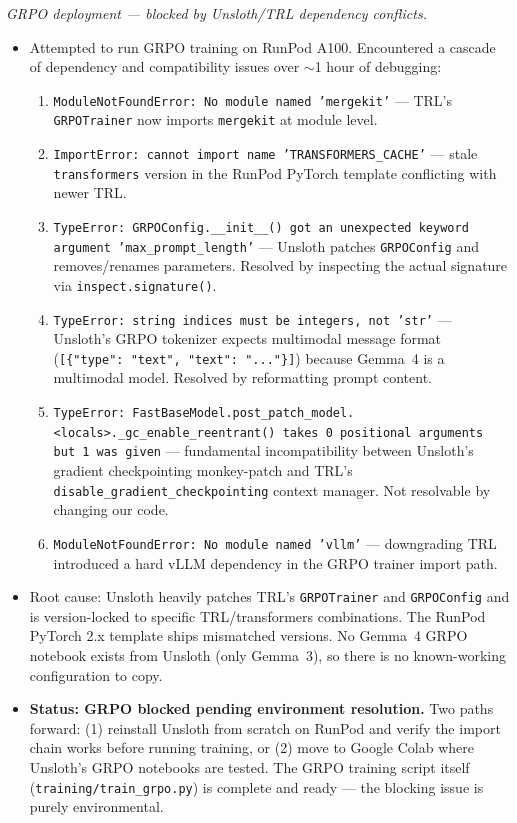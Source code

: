 \documentclass{article}
\theoremstyle{plain}
\theoremstyle{definition}
\theoremstyle{remark}
\begin{document}
\textit{GRPO deployment --- blocked by Unsloth/TRL dependency conflicts.}
\begin{itemize}
\item Attempted to run GRPO training on RunPod A100. Encountered a cascade of dependency and compatibility issues over $\sim$1 hour of debugging:
  \begin{enumerate}
  \item \texttt{ModuleNotFoundError: No module named 'mergekit'} --- TRL's \texttt{GRPOTrainer} now imports \texttt{mergekit} at module level.
  \item \texttt{ImportError: cannot import name 'TRANSFORMERS\_CACHE'} --- stale \texttt{transformers} version in the RunPod PyTorch template conflicting with newer TRL.
  \item \texttt{TypeError: GRPOConfig.\_\_init\_\_() got an unexpected keyword argument 'max\_prompt\_length'} --- Unsloth patches \texttt{GRPOConfig} and removes/renames parameters. Resolved by inspecting the actual signature via \texttt{inspect.signature()}.
  \item \texttt{TypeError: string indices must be integers, not 'str'} --- Unsloth's GRPO tokenizer expects multimodal message format (\texttt{[\{"type": "text", "text": "..."\}]}) because Gemma~4 is a multimodal model. Resolved by reformatting prompt content.
  \item \texttt{TypeError: FastBaseModel.post\_patch\_model.<locals>.\_gc\_enable\_reentrant() takes 0 positional arguments but 1 was given} --- fundamental incompatibility between Unsloth's gradient checkpointing monkey-patch and TRL's \texttt{disable\_gradient\_checkpointing} context manager. Not resolvable by changing our code.
  \item \texttt{ModuleNotFoundError: No module named 'vllm'} --- downgrading TRL introduced a hard vLLM dependency in the GRPO trainer import path.
  \end{enumerate}
\item Root cause: Unsloth heavily patches TRL's \texttt{GRPOTrainer} and \texttt{GRPOConfig} and is version-locked to specific TRL/transformers combinations. The RunPod PyTorch 2.x template ships mismatched versions. No Gemma~4 GRPO notebook exists from Unsloth (only Gemma~3), so there is no known-working configuration to copy.
\item \textbf{Status: GRPO blocked pending environment resolution.} Two paths forward: (1) reinstall Unsloth from scratch on RunPod and verify the import chain works before running training, or (2) move to Google Colab where Unsloth's GRPO notebooks are tested. The GRPO training script itself (\texttt{training/train\_grpo.py}) is complete and ready --- the blocking issue is purely environmental.
\end{itemize}
\end{document}
